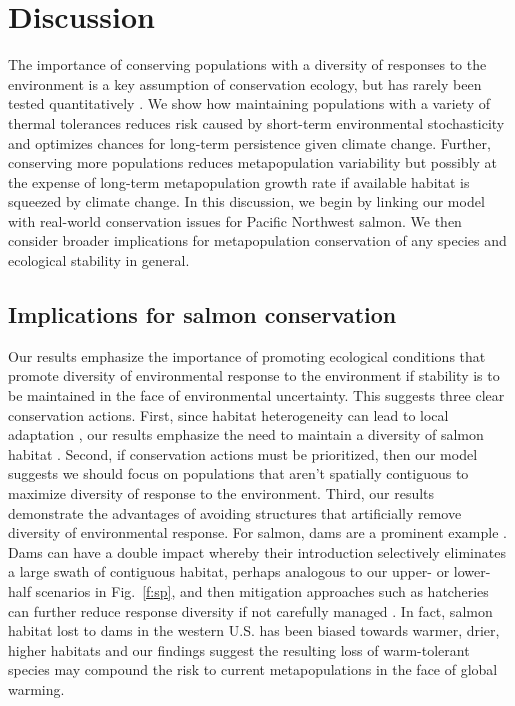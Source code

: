 \section{Discussion}

The importance of conserving populations with a diversity of responses to the environment is a key assumption of conservation ecology, but has rarely been tested quantitatively \citep{mori2013}. We show how maintaining populations with a variety of thermal tolerances reduces risk caused by short-term environmental stochasticity and optimizes chances for long-term persistence given climate change. Further, conserving more populations reduces metapopulation variability but possibly at the expense of long-term metapopulation growth rate if available habitat is squeezed by climate change. In this discussion, we begin by linking our model with real-world conservation issues for Pacific Northwest salmon. We then consider broader implications for metapopulation conservation of any species and ecological stability in general.

\subsection{Implications for salmon conservation}

Our results emphasize the importance of promoting ecological conditions that promote diversity of environmental response to the environment if stability is to be maintained in the face of environmental uncertainty. This suggests three clear conservation actions. First, since habitat heterogeneity can lead to local adaptation \citep[e.g.][]{fraser2011}, our results emphasize the need to maintain a diversity of salmon habitat \citep{rogers2008}. Second, if conservation actions must be prioritized, then our model suggests we should focus on populations that aren't spatially contiguous to maximize diversity of response to the environment. Third, our results demonstrate the advantages of avoiding structures that artificially remove diversity of environmental response. For salmon, dams are a prominent example \citep{mcclure2008a}. Dams can have a double impact whereby their introduction selectively eliminates a large swath of contiguous habitat, perhaps analogous to our upper- or lower-half scenarios in Fig.~\ref{f:sp}, and then mitigation approaches such as hatcheries can further reduce response diversity if not carefully managed \citep{mcclure2008b}. In fact, salmon habitat lost to dams in the western U.S. has been biased towards warmer, drier, higher habitats \citep{mcclure2008a} and our findings suggest the resulting loss of warm-tolerant species may compound the risk to current metapopulations in the face of global warming.

